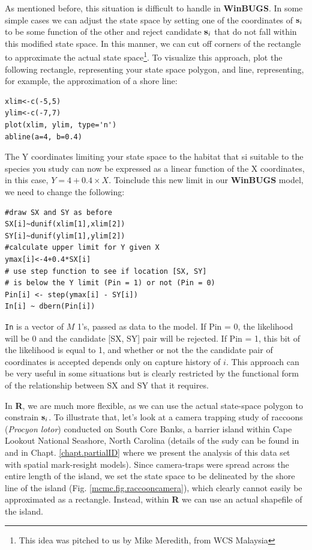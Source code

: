 As mentioned before, this situation is difficult to handle in {\bf WinBUGS}.
In some simple cases we can adjust the state space by setting one of the
coordinates of ${\bf s}_{i}$ to be some function of the other and reject candidate ${\bf s}_{i}$ that do not fall within this modified state space.
In this manner, we can cut off corners of the rectangle to approximate
the actual state space\footnote{This idea was pitched to us by Mike Meredith, from WCS Malaysia}. To visualize this approach, plot the following rectangle, representing your state space polygon, and line, representing, for example, the approximation of a shore line:
\begin{verbatim}
xlim<-c(-5,5)
ylim<-c(-7,7)
plot(xlim, ylim, type='n')
abline(a=4, b=0.4)
\end{verbatim}
The Y coordinates limiting your state space to the habitat that si suitable to the species you study can now be expressed as a linear function of the X coordinates, in this case, $Y=4+0.4 \times X$.
Toinclude this new limit in our {\bf WinBUGS} model, we need to change the following:
\begin{verbatim}
#draw SX and SY as before
SX[i]~dunif(xlim[1],xlim[2])
SY[i]~dunif(ylim[1],ylim[2])
#calculate upper limit for Y given X
ymax[i]<-4+0.4*SX[i]
# use step function to see if location [SX, SY]
# is below the Y limit (Pin = 1) or not (Pin = 0)
Pin[i] <- step(ymax[i] - SY[i])
In[i] ~ dbern(Pin[i])
\end{verbatim}
{\tt In} is a vector of $M$ 1's, passed as data to the model. If Pin = 0, the likelihood will be 0 and the candidate [SX, SY] pair will be rejected. If Pin = 1, this bit of the likelihood is equal to 1, and whether or not the the candidate pair of coordinates is accepted depends only on capture history of $i$. This approach can be very useful in some situations but is clearly restricted by the functional form of the relationship between SX and SY that it requires.

In {\bf R}, we are much more flexible, as we can
use the actual state-space polygon to constrain ${\bf s}_i$.
To illustrate that, let's look at a camera
trapping study of raccoons (\emph{Procyon lotor}) conducted
on South Core Banks, a barrier island within Cape Lookout National Seashore, North Carolina
(details of the sudy can be found in \citet{sollmann_etal:2012ecol} and in Chapt. \ref{chapt.partialID} where we present the analysis of this data set with spatial mark-resight models). Since camera-traps were spread across the entire length of the island, we set the state space to be delineated by the shore line of the island (Fig. \ref{mcmc.fig.raccooncamera}), which clearly cannot easily be approximated as a rectangle.
Instead, within {\bf R} we can use an actual shapefile of the island.

